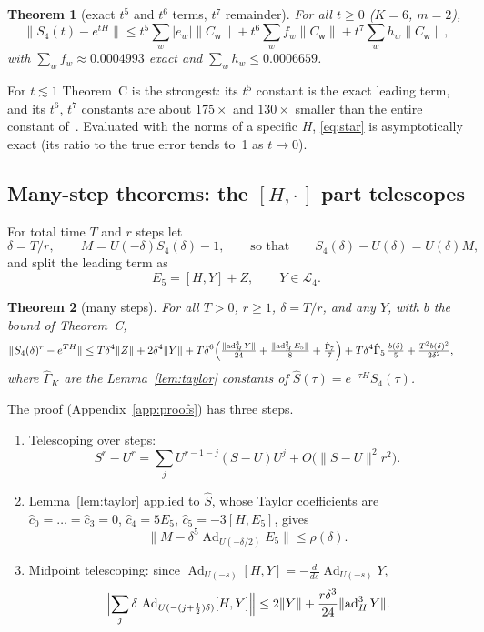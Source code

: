 \documentclass[11pt]{article}
\newcommand{\ad}{\operatorname{ad}}
\newcommand{\Ad}{\operatorname{Ad}}
\newcommand{\norm}[1]{\lVert #1\rVert}
\newcommand{\abs}[1]{\lvert #1\rvert}
\newcommand{\Lie}{\mathcal{L}}
\newcommand{\C}[1]{C_{\mathsf{#1}}}
\theoremstyle{plain}
\newtheorem{theorem}{Theorem}
\theoremstyle{definition}
\theoremstyle{remark}
\begin{document}
\begin{theorem}[exact $t^5$ and $t^6$ terms, $t^7$ remainder]\label{thm:C}
For all $t\ge0$ ($K=6$, $m=2$),
\[
\norm{S_4(t)-e^{tH}}\le t^5\sum_w\abs{e_w}\norm{\C w}+t^6\sum_wf_w\norm{\C w}+t^7\sum_wh_w\norm{\C w},
\]
with $\sum_wf_w\approx0.0004993$ exact and $\sum_wh_w\le0.0006659$.
\end{theorem}

For $t\lesssim1$ Theorem~C is the strongest: its $t^5$ constant is the exact leading term, and its
$t^6$, $t^7$ constants are about $175\times$ and $130\times$ smaller than the entire constant
of~\cite{Childs2021}. Evaluated with the norms of a specific $H$, \eqref{eq:star} is asymptotically exact
(its ratio to the true error tends to~1 as $t\to0$).

\subsection{Many-step theorems: the \texorpdfstring{$[H,\cdot\,]$}{[H,.]} part telescopes}

For total time $T$ and $r$ steps let
\[
\delta=T/r,\qquad M=U(-\delta)S_4(\delta)-1,\qquad\text{so that}\qquad S_4(\delta)-U(\delta)=U(\delta)M,
\]
and split the leading term as
\[
E_5=[H,Y]+Z,\qquad Y\in\Lie_4 .
\]

\begin{theorem}[many steps]\label{thm:D}
For all $T>0$, $r\ge1$, $\delta=T/r$, and any $Y$, with $b$ the bound of Theorem~C,
\[
\begin{aligned}
\norm{S_4(\delta)^r-e^{TH}}\le{}&T\delta^4\norm Z+2\delta^4\norm Y
+T\delta^6\Bigl(\tfrac{\norm{\ad_H^3Y}}{24}+\tfrac{\norm{\ad_H^2E_5}}8+\tfrac{\hat\Gamma_7}7\Bigr)
+T\delta^4\hat\Gamma_5\,\tfrac{b(\delta)}5+\tfrac{T^2b(\delta)^2}{2\delta^2},
\end{aligned}
\]
where $\hat\Gamma_K$ are the Lemma~\ref{lem:taylor} constants of $\hat S(\tau)=e^{-\tau H}S_4(\tau)$.
\end{theorem}

The proof (Appendix~\ref{app:proofs}) has three steps.
\begin{enumerate}[leftmargin=*]
\item Telescoping over steps:
\[
S^r-U^r=\sum_jU^{r-1-j}(S-U)U^j+O\bigl(\norm{S-U}^2r^2\bigr).
\]
\item Lemma~\ref{lem:taylor} applied to $\hat S$, whose Taylor coefficients are
$\hat c_0=\dots=\hat c_3=0$, $\hat c_4=5E_5$, $\hat c_5=-3[H,E_5]$, gives
\[
\norm{M-\delta^5\Ad_{U(-\delta/2)}E_5}\le\rho(\delta).
\]
\item Midpoint telescoping: since $\Ad_{U(-s)}[H,Y]=-\tfrac{d}{ds}\Ad_{U(-s)}Y$,
\[
\Bigl\lVert\sum_j\delta\,\Ad_{U(-(j+\frac12)\delta)}[H,Y]\Bigr\rVert\le2\norm Y+\frac{r\delta^3}{24}\norm{\ad_H^3Y}.
\]
\end{enumerate}
\end{document}

